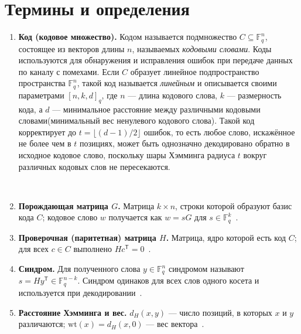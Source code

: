 
\section{Термины и определения}





\begin{enumerate}

\item \label{def:code}
\textbf{Код (кодовое множество).}
Кодом называется подмножество \(C \subseteq \mathbb{F}_q^n\),
состоящее из векторов длины \(n\), называемых \emph{кодовыми словами}.
Коды используются для обнаружения и исправления ошибок при передаче данных по каналу с помехами.
Если \(C\) образует линейное подпространство пространства \(\mathbb{F}_q^n\),
такой код называется \emph{линейным} и описывается своими параметрами \([n,k,d]_q\),
где \(n\) — длина кодового слова, \(k\) — размерность кода,
а \(d\) — минимальное расстояние между различными кодовыми словами(минимальный вес ненулевого кодового слова).
Такой код корректирует до \(t=\lfloor(d-1)/2\rfloor\) ошибок,
то есть любое слово, искажённое не более чем в \(t\) позициях,
может быть однозначно декодировано обратно в исходное кодовое слово,
поскольку шары Хэмминга радиуса \(t\) вокруг различных кодовых слов не пересекаются.
~\cite{MacWilliamsSloane1977,HuffmanPless2003}

~\cite{MacWilliamsSloane1977,HuffmanPless2003,vanLint1999}



\item \label{def:G}
\textbf{Порождающая матрица \(G\).}
Матрица \(k\times n\), строки которой образуют базис кода \(C\); кодовое слово \(w\) получается как \(w=sG\) для \(s\in\mathbb{F}_q^k\)~\cite{HuffmanPless2003}.

\item \label{def:H}
\textbf{Проверочная (паритетная) матрица \(H\).}
Матрица, ядро которой есть код \(C\); для всех \(c\in C\) выполнено \(Hc^{\mathsf T}=0\)~\cite{MacWilliamsSloane1977,HuffmanPless2003}.

\item \label{def:syndrome}
\textbf{Синдром.}
Для полученного слова \(y\in\mathbb{F}_q^n\) синдромом называют \(s=Hy^{\mathsf T}\in\mathbb{F}_q^{n-k}\). Синдром одинаков для всех слов одного косета и используется при декодировании~\cite{HuffmanPless2003}.

\item \label{def:hamming}
\textbf{Расстояние Хэмминга и вес.}
\(d_H(x,y)\) — число позиций, в которых \(x\) и \(y\) различаются; \(\mathrm{wt}(x)=d_H(x,0)\) — вес вектора~\cite{vanLint1999,HuffmanPless2003}.


\end{enumerate}
